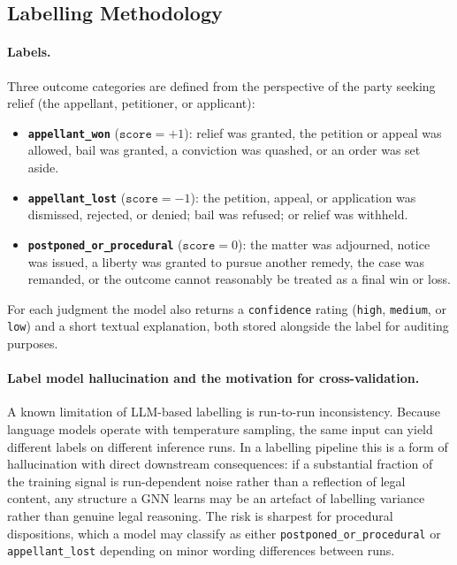 \subsection{Labelling Methodology}
\label{sec:labelling_methodology}

\paragraph{Labels.}
Three outcome categories are defined from the perspective of the party seeking
relief (the appellant, petitioner, or applicant):

\begin{itemize}
  \item \textbf{\texttt{appellant\_won}} ($\texttt{score} = +1$): relief was
    granted, the petition or appeal was allowed, bail was granted, a conviction
    was quashed, or an order was set aside.
  \item \textbf{\texttt{appellant\_lost}} ($\texttt{score} = -1$): the petition,
    appeal, or application was dismissed, rejected, or denied; bail was refused;
    or relief was withheld.
  \item \textbf{\texttt{postponed\_or\_procedural}} ($\texttt{score} = 0$): the
    matter was adjourned, notice was issued, a liberty was granted to pursue
    another remedy, the case was remanded, or the outcome cannot reasonably be
    treated as a final win or loss.
\end{itemize}

For each judgment the model also returns a \texttt{confidence} rating
(\texttt{high}, \texttt{medium}, or \texttt{low}) and a short textual
explanation, both stored alongside the label for auditing purposes.

\paragraph{Label model hallucination and the motivation for cross-validation.}
A known limitation of LLM-based labelling is run-to-run inconsistency. Because
language models operate with temperature sampling, the same input can yield
different labels on different inference runs. In a labelling pipeline this is a
form of hallucination with direct downstream consequences: if a substantial
fraction of the training signal is run-dependent noise rather than a reflection
of legal content, any structure a GNN learns may be an artefact of labelling
variance rather than genuine legal reasoning. The risk is sharpest for procedural
dispositions, which a model may classify as either
\texttt{postponed\_or\_procedural} or \texttt{appellant\_lost} depending on minor
wording differences between runs.

